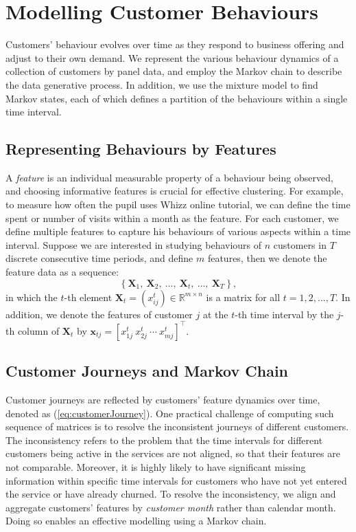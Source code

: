 \section{Modelling Customer Behaviours}
\label{sec:model}

Customers' behaviour evolves over time as they respond to business offering and adjust to their own demand. We represent the various behaviour dynamics of a collection of customers by panel data, and employ the Markov chain to describe the data generative process. In addition, we use the mixture model to find Markov states, each of which defines a partition of the behaviours within a single time interval.

\subsection{Representing Behaviours by Features}

A \textit{feature} is an individual measurable property of a behaviour being observed, and choosing informative features is crucial for effective clustering. For example, to measure how often the pupil uses Whizz online tutorial, we can define the time spent or number of visits within a month as the feature. For each customer, we define multiple features to capture his behaviours of various aspects within a time interval. Suppose we are interested in studying behaviours of $n$ customers in $T$ discrete consecutive time periods, and define $m$ features, then we denote the feature data as a sequence:
\begin{equation}
\label{eq:customerJourney}
\left\lbrace \mathbf{X}_1, ~\mathbf{X}_2, ~\dots, ~\mathbf{X}_t, ~\dots, ~\mathbf{X}_T \right\rbrace,
\end{equation}
in which the $t$-th element $\mathbf{X}_t = (x_{ij}^t) \in \mathbb{R}^{m \times n}$ is a matrix for all $t=1,2,\dots,T$. In addition, we denote the features of customer $j$ at the $t$-th time interval by the $j$-th column of $\mathbf{X}_t$ by $\mathbf{x}_{tj} = [x_{1j}^t ~x_{2j}^t ~\cdots ~x_{mj}^t]^\top$.

\subsection{Customer Journeys and Markov Chain}

Customer journeys are reflected by customers' feature dynamics over time, denoted as (\ref{eq:customerJourney}). One practical challenge of computing such sequence of matrices is to resolve the inconsistent journeys of different customers. The inconsistency refers to the problem that the time intervals for different customers being active in the services are not aligned, so that their features are not comparable. Moreover, it is highly likely to have significant missing information within specific time intervals for customers who have not yet entered the service or have already churned. To resolve the inconsistency, we align and aggregate customers' features by \textit{customer month} rather than calendar month. Doing so enables an effective modelling using a Markov chain.

